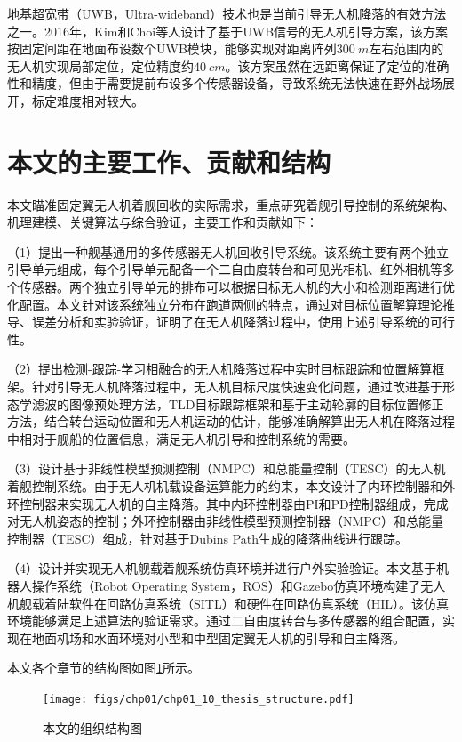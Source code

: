 地基超宽带（UWB，Ultra-wideband）技术也是当前引导无人机降落的有效方法之一。2016年，Kim和Choi等人\cite{kim2016uwb}设计了基于UWB信号的无人机引导方案，该方案按固定间距在地面布设数个UWB模块，能够实现对距离阵列$300\ m$左右范围内的无人机实现局部定位，定位精度约$40\ cm$。该方案虽然在远距离保证了定位的准确性和精度，但由于需要提前布设多个传感器设备，导致系统无法快速在野外战场展开，标定难度相对较大。

\section{本文的主要工作、贡献和结构}
本文瞄准固定翼无人机着舰回收的实际需求，重点研究着舰引导控制的系统架构、机理建模、关键算法与综合验证，主要工作和贡献如下：

（1）提出一种舰基通用的多传感器无人机回收引导系统。该系统主要有两个独立引导单元组成，每个引导单元配备一个二自由度转台和可见光相机、红外相机等多个传感器。两个独立引导单元的排布可以根据目标无人机的大小和检测距离进行优化配置。本文针对该系统独立分布在跑道两侧的特点，通过对目标位置解算理论推导、误差分析和实验验证，证明了在无人机降落过程中，使用上述引导系统的可行性。

（2）提出检测-跟踪-学习相融合的无人机降落过程中实时目标跟踪和位置解算框架。针对引导无人机降落过程中，无人机目标尺度快速变化问题，通过改进基于形态学滤波的图像预处理方法，TLD目标跟踪框架和基于主动轮廓的目标位置修正方法，结合转台运动位置和无人机运动的估计，能够准确解算出无人机在降落过程中相对于舰船的位置信息，满足无人机引导和控制系统的需要。

（3）设计基于非线性模型预测控制（NMPC）和总能量控制（TESC）的无人机着舰控制系统。由于无人机机载设备运算能力的约束，本文设计了内环控制器和外环控制器来实现无人机的自主降落。其中内环控制器由PI和PD控制器组成，完成对无人机姿态的控制；外环控制器由非线性模型预测控制器（NMPC）和总能量控制器（TESC）组成，针对基于Dubins Path生成的降落曲线进行跟踪。

（4）设计并实现无人机舰载着舰系统仿真环境并进行户外实验验证。本文基于机器人操作系统（Robot Operating System，ROS）和Gazebo仿真环境构建了无人机舰载着陆软件在回路仿真系统（SITL）和硬件在回路仿真系统（HIL）。该仿真环境能够满足上述算法的验证需求。通过二自由度转台与多传感器的组合配置，实现在地面机场和水面环境对小型和中型固定翼无人机的引导和自主降落。

本文各个章节的结构图如图\ref{fig:chp01_10_thesis_structure}所示。
\begin{figure}[!h]   
	\centering	
	\texttt{[image: figs/chp01/chp01\_10\_thesis\_structure.pdf]}
	\caption{本文的组织结构图}
	\label{fig:chp01_10_thesis_structure}
\end{figure}
